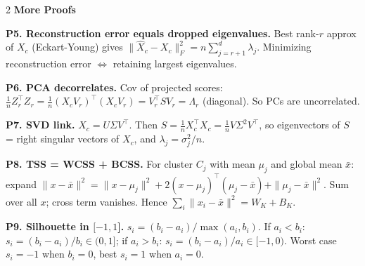 \documentclass[10pt,fleqn]{article}
\newcommand{\shead}[1]{\vspace{0.1ex}\textbf{\scriptsize #1}\par}
\newcommand{\qa}[2]{\textbf{#1} #2\par}
\begin{document}
\begin{multicols*}{2}
\shead{More Proofs}
\qa{P5. Reconstruction error equals dropped eigenvalues.}{Best rank-\(r\) approx of \(X_c\) (Eckart-Young) gives \(\|\widehat X_c - X_c\|_F^2 = n\sum_{j=r+1}^d\lambda_j\). Minimizing reconstruction error \(\Leftrightarrow\) retaining largest eigenvalues.}
\qa{P6. PCA decorrelates.}{Cov of projected scores: \(\frac1n Z_r^\top Z_r = \frac1n (X_cV_r)^\top(X_cV_r) = V_r^\top SV_r = \Lambda_r\) (diagonal). So PCs are uncorrelated.}
\qa{P7. SVD link.}{\(X_c = U\Sigma V^\top\). Then \(S=\frac1n X_c^\top X_c=\frac1n V\Sigma^2V^\top\), so eigenvectors of \(S\) = right singular vectors of \(X_c\), and \(\lambda_j=\sigma_j^2/n\).}
\qa{P8. TSS = WCSS + BCSS.}{For cluster \(C_j\) with mean \(\mu_j\) and global mean \(\bar x\): expand \(\|x-\bar x\|^2 = \|x-\mu_j\|^2 + 2(x-\mu_j)^\top(\mu_j-\bar x)+\|\mu_j-\bar x\|^2\). Sum over all \(x\); cross term vanishes. Hence \(\sum_i\|x_i-\bar x\|^2=W_K+B_K\).}
\qa{P9. Silhouette in \([-1,1\)].}{\(s_i=(b_i-a_i)/\max(a_i,b_i)\). If \(a_i < b_i\): \(s_i=(b_i-a_i)/b_i\in(0,1]\); if \(a_i > b_i\): \(s_i=(b_i-a_i)/a_i\in[-1,0)\). Worst case \(s_i=-1\) when \(b_i=0\), best \(s_i=1\) when \(a_i=0\).}


\end{multicols*}
\end{document}

